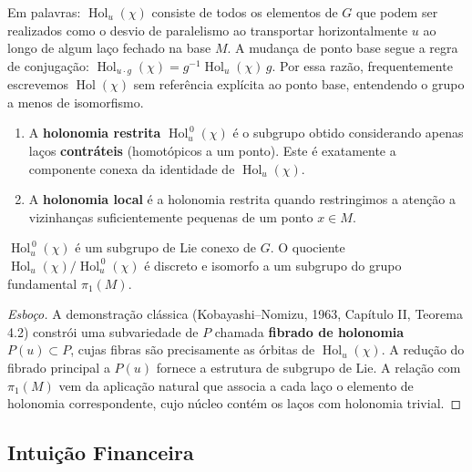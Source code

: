 Em palavras: \(\operatorname{Hol}_u(\chi)\) consiste de todos os elementos de \(G\) que podem ser realizados como o desvio de paralelismo ao transportar horizontalmente \(u\) ao longo de algum la\c{c}o fechado na base \(M\). A mudan\c{c}a de ponto base segue a regra de conjuga\c{c}\~ao: \(\operatorname{Hol}_{u \cdot g}(\chi) = g^{-1} \operatorname{Hol}_u(\chi) \, g\). Por essa raz\~ao, frequentemente escrevemos \(\operatorname{Hol}(\chi)\) sem refer\^encia expl\'icita ao ponto base, entendendo o grupo a menos de isomorfismo.

\begin{defi}
\begin{enumerate}
 \item A \textbf{holonomia restrita} \(\operatorname{Hol}_u^{\,0}(\chi)\) \'e o subgrupo obtido considerando apenas la\c{c}os \textbf{contr\'ateis} (homot\'opicos a um ponto). Este \'e exatamente a componente conexa da identidade de \(\operatorname{Hol}_u(\chi)\).
 \item A \textbf{holonomia local} \'e a holonomia restrita quando restringimos a aten\c{c}\~ao a vizinhan\c{c}as suficientemente pequenas de um ponto \(x \in M\).
\end{enumerate}
\end{defi}

\begin{prop}
\(\operatorname{Hol}_u^{\,0}(\chi)\) \'e um subgrupo de Lie conexo de \(G\). O quociente \(\operatorname{Hol}_u(\chi) / \operatorname{Hol}_u^{\,0}(\chi)\) \'e discreto e isomorfo a um subgrupo do grupo fundamental \(\pi_1(M)\).
\end{prop}

\begin{proof}[Esbo\c{c}o]
A demonstra\c{c}\~ao cl\'assica (Kobayashi--Nomizu, 1963, Cap\'itulo II, Teorema 4.2) constr\'oi uma subvariedade de \(P\) chamada \textbf{fibrado de holonomia} \(P(u) \subset P\), cujas fibras s\~ao precisamente as \'orbitas de \(\operatorname{Hol}_u(\chi)\). A redu\c{c}\~ao do fibrado principal a \(P(u)\) fornece a estrutura de subgrupo de Lie. A rela\c{c}\~ao com \(\pi_1(M)\) vem da aplica\c{c}\~ao natural que associa a cada la\c{c}o o elemento de holonomia correspondente, cujo n\'ucleo cont\'em os la\c{c}os com holonomia trivial.
\end{proof}

\subsection{Intui\c{c}\~ao Financeira}

